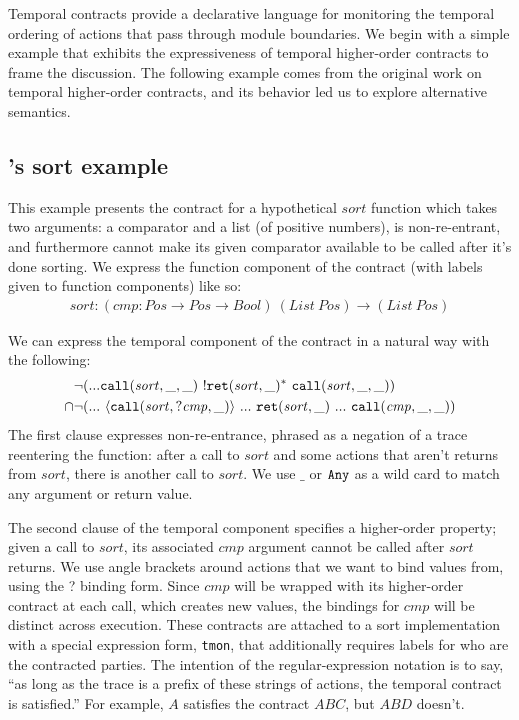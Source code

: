 Temporal contracts provide a declarative language for monitoring the temporal ordering of actions that pass through module boundaries.
%
We begin with a simple example that exhibits the expressiveness of temporal higher-order contracts to frame the discussion.
%
The following example comes from the original work on temporal higher-order contracts, and its behavior led us to explore alternative semantics.
%
\newcommand{\sortid}{\mathit{sort}}
\subsection{\dfm's sort example} \label{sec:sort}
%
This example presents the contract for a hypothetical $\sortid$ function which takes two arguments: a comparator and a list (of positive numbers), is non-re-entrant, and furthermore cannot make its given comparator available to be called after it's done sorting.
%
We express the function component of the contract (with labels given to function components) like so:
\begin{align*}
  \sortid : (\mathit{cmp} : \mathit{Pos} \to \mathit{Pos} \to \mathit{Bool})\ (List\ Pos) \to (List\ Pos)
\end{align*}

We can express the temporal component of the contract in a natural way with the following:
\renewcommand*{\arraystretch}{1.2}
\newcommand*{\call}[1]{\scallev{#1}{\_}}
\newcommand*{\ret}[1]{\sretev{#1}{\_}}
\begin{align*}
  &\stnot{(\sddd {\tt call}(\sortid, \_,\_)~ \stmany{\snonevent{{\tt ret}(\sortid, \_)}}~ {\tt call}(\sortid,\_,\_))}
  \\\cap & \stnot{(\sddd~ \stbind{{\tt call}(\sortid, ?\mathit{cmp}, \_)}{\sddd~ {\tt ret}(\sortid, \_)~ \sddd~ {\tt call}(\mathit{cmp}, \_, \_)})}
\end{align*}
%
The first clause expresses non-re-entrance, phrased as a negation of a trace reentering the function: after a call to $\sortid$ and some actions that aren't returns from $\sortid$, there is another call to $\sortid$.
%
We use $\_$ or ${\tt Any}$ as a wild card to match any argument or return value.

The second clause of the temporal component specifies a higher-order property; given a call to $\sortid$, its associated $\mathit{cmp}$ argument cannot be called after $\sortid$ returns.
%
We use angle brackets around actions that we want to bind values from, using the ? binding form.
%
Since $\mathit{cmp}$ will be wrapped with its higher-order contract at each call, which creates new values, the bindings for $\mathit{cmp}$ will be distinct across execution.
These contracts are attached to a sort implementation with a special expression form, {\tt tmon}, that additionally requires labels for who are the contracted parties.
%
The intention of the regular-expression notation is to say, ``as long as the trace is a prefix of these strings of actions, the temporal contract is satisfied.''
%
For example, $A$ satisfies the contract $ABC$, but $ABD$ doesn't.


